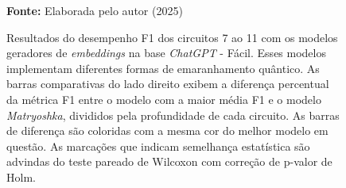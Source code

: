 \begin{figure}
\caption{Resultados do desempenho F1 dos circuitos 7 ao 11 com os modelos geradores de \textit{embeddings} na base \textit{ChatGPT} - Fácil. Esses modelos implementam diferentes formas de emaranhamento quântico. As barras comparativas do lado direito exibem a diferença percentual da métrica F1 entre o modelo com a maior média F1 e o modelo \textit{Matryoshka}, divididos pela profundidade de cada circuito. As barras de diferença são coloridas com a mesma cor do melhor modelo em questão. As marcações que indicam semelhança estatística são advindas do teste pareado de Wilcoxon com correção de p-valor de Holm.}
\label{fig:model_transformer:easy:g2}
     \centering
    \centering

      \par\medskip\ABNTEXfontereduzida\selectfont\textbf{Fonte:} Elaborada pelo autor (2025) \par\medskip
\end{figure}